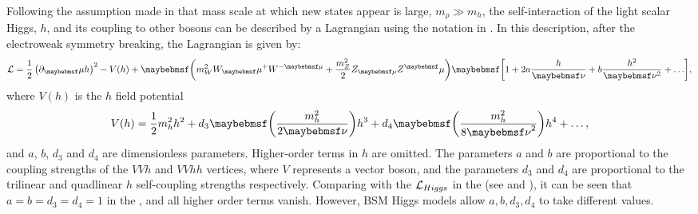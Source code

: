Following the assumption made in  \cite{Contino:2010mh,Contino:2013gna} that mass scale at which new states appear is large, $m_{\rho} \gg m_{h}$, the self-interaction of the light scalar Higgs, $h$, and its coupling to other \SM bosons can be described by a Lagrangian using the notation in  \cite{Contino:2013gna}. In this description, after the electroweak symmetry breaking, the  Lagrangian is given by:
\begin{equation}
\Lagr =\frac{1}{2}\left(\partial_\mu{h}\right)^2  - V(h) + \parenths{m_W^2{W}_\mu^+{W}^{-\mu} + \frac{m_Z^2}{2}Z_{\mu}Z^\mu}\sqbracs{1 + 2a\frac{h}{\nu} + b \frac{h^2}{\nu^2} + \hdots},
\end{equation}
where $V(h)$ is the $h$ field potential
\begin{equation}
V(h) = \frac{1}{2}m_h^2h^2 + d_3\parenths{\frac{m_h^2}{2\nu}}h^3 + d_4\parenths{\frac{m_h^2}{8{\nu}^2}}h^4 + \hdots ,
\end{equation}
and $a$, $b$, $d_3$ and $d_4$ are  dimensionless parameters. Higher-order terms in $h$ are omitted. The parameters $a$ and $b$ are proportional to the coupling strengths of the $VVh$ and $VVhh$ vertices, where $V$ represents a vector boson, and the parameters $d_3$ and $d_4$ are proportional to the trilinear and quadlinear $h$ self-coupling strengths respectively. Comparing with the  $\operatorname{\mathcal{L}}_{Higgs} $ in the \SM (see  and ),  it can be seen that $a=b=d_3=d_4=1$ in the \SM, and all higher order terms vanish. However, BSM Higgs models allow $a,b,d_3,d_4$ to take different values.

